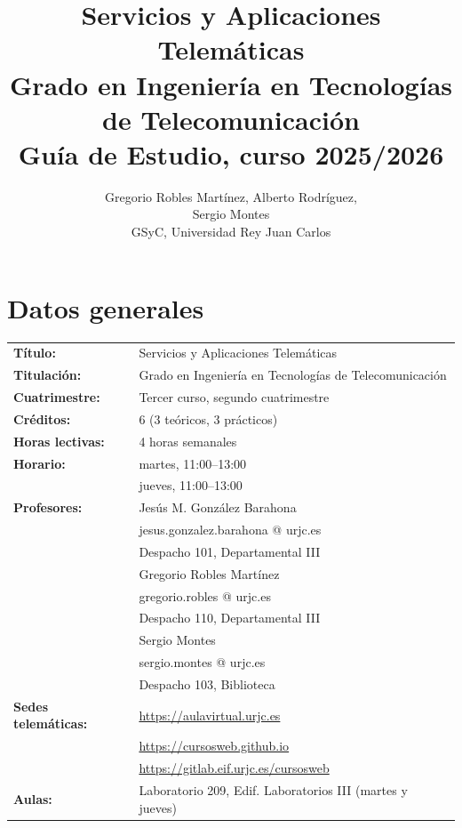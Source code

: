 \documentclass[a4paper,12pt]{article}
\title{Servicios y Aplicaciones Telemáticas \\
Grado en Ingeniería en Tecnologías de Telecomunicación \\
Guía de Estudio, curso 2025/2026}
\author{Gregorio Robles Martínez, Alberto Rodríguez, \\
  Sergio Montes \\
GSyC, Universidad Rey Juan Carlos}
\begin{document}
\maketitle

\tableofcontents

\newpage

\section{Datos generales}

\begin{tabular}{ll}
\textbf{Título:} & Servicios y Aplicaciones Telemáticas \\
\textbf{Titulación:} & Grado en Ingeniería en Tecnologías de Telecomunicación \\
\textbf{Cuatrimestre:} & Tercer curso, segundo cuatrimestre \\
\textbf{Créditos:} & 6 (3 teóricos, 3 prácticos) \\
\textbf{Horas lectivas:} & 4 horas semanales \\
\textbf{Horario:} & martes, 11:00--13:00 \\
                  & jueves, 11:00--13:00 \\
\textbf{Profesores:}
& Jesús M. González Barahona \\
& \hspace{1cm}jesus.gonzalez.barahona @ urjc.es \\
& \hspace{1cm}Despacho 101, Departamental III\\
& Gregorio Robles Martínez \\
& \hspace{1cm}gregorio.robles @ urjc.es \\
& \hspace{1cm}Despacho 110, Departamental III\\
& Sergio Montes\\
& \hspace{1cm}sergio.montes @ urjc.es \\
& \hspace{1cm}Despacho 103, Biblioteca\\
\textbf{Sedes telemáticas:} & \url{https://aulavirtual.urjc.es} \\
                            & \url{https://cursosweb.github.io} \\
                            & \url{https://gitlab.eif.urjc.es/cursosweb} \\
\textbf{Aulas:} & Laboratorio 209, Edif. Laboratorios III (martes y jueves) \\
\end{tabular}
\end{document}
